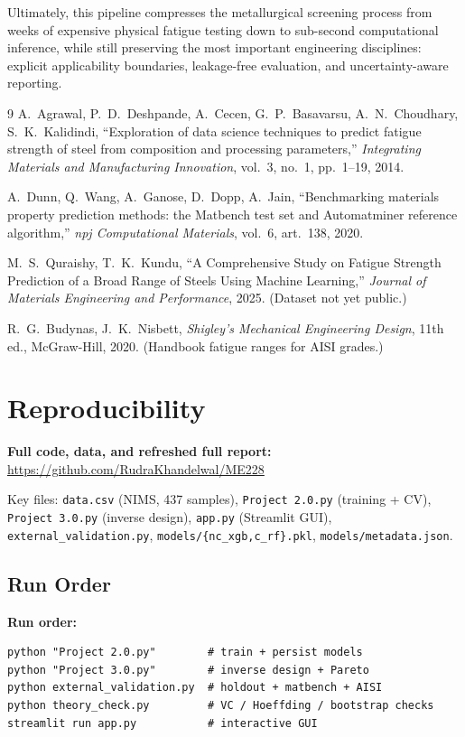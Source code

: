 \documentclass[12pt,a4paper]{article} %
\begin{document}
Ultimately, this pipeline compresses the metallurgical screening process from weeks of
expensive physical fatigue testing down to sub-second computational inference, while still
preserving the most important engineering disciplines: explicit applicability boundaries,
leakage-free evaluation, and uncertainty-aware reporting.

\clearpage
\begin{thebibliography}{9}
  A.~Agrawal, P.~D.~Deshpande, A.~Cecen, G.~P.~Basavarsu, A.~N.~Choudhary, S.~K.~Kalidindi,
  ``Exploration of data science techniques to predict fatigue strength of steel from composition
  and processing parameters,''
  \textit{Integrating Materials and Manufacturing Innovation}, vol.~3, no.~1, pp.~1--19, 2014.

  A.~Dunn, Q.~Wang, A.~Ganose, D.~Dopp, A.~Jain, ``Benchmarking materials property prediction
  methods: the Matbench test set and Automatminer reference algorithm,''
  \textit{npj Computational Materials}, vol.~6, art.~138, 2020.

  M.~S.~Quraishy, T.~K.~Kundu, ``A Comprehensive Study on Fatigue Strength Prediction of a
  Broad Range of Steels Using Machine Learning,''
  \textit{Journal of Materials Engineering and Performance}, 2025. (Dataset not yet public.)

  R.~G.~Budynas, J.~K.~Nisbett, \textit{Shigley's Mechanical Engineering Design}, 11th ed.,
  McGraw-Hill, 2020. (Handbook fatigue ranges for AISI grades.)
\end{thebibliography}

\appendix
\section{Reproducibility}

\textbf{Full code, data, and refreshed full report:}
\url{https://github.com/RudraKhandelwal/ME228}

Key files: \texttt{data.csv} (NIMS, 437 samples), \texttt{Project 2.0.py} (training + CV), \texttt{Project 3.0.py} (inverse design), \texttt{app.py} (Streamlit GUI), \texttt{external\_validation.py}, \texttt{models/\{nc\_xgb,c\_rf\}.pkl}, \texttt{models/metadata.json}.

\subsection{Run Order}
\textbf{Run order:}
\begin{lstlisting}
python "Project 2.0.py"        # train + persist models
python "Project 3.0.py"        # inverse design + Pareto
python external_validation.py  # holdout + matbench + AISI
python theory_check.py         # VC / Hoeffding / bootstrap checks
streamlit run app.py           # interactive GUI
\end{lstlisting}
\end{document}
